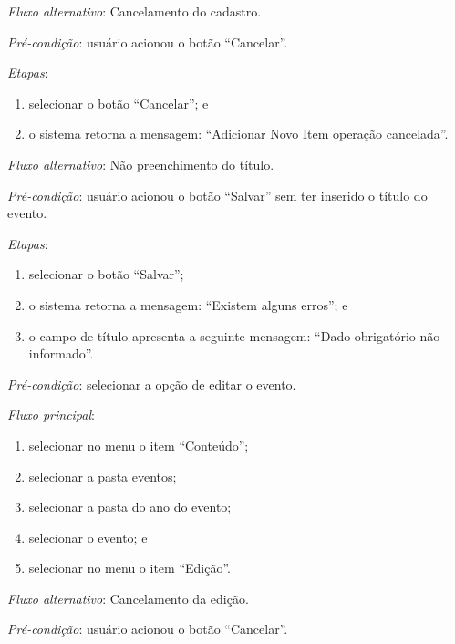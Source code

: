 \documentclass[a4paper,12pt]{article}
\begin{document}
\noindent \textit{Fluxo alternativo}: Cancelamento do cadastro.

\noindent \textit{Pré-condição}:  usuário acionou o botão ``Cancelar''.

\noindent \textit{Etapas}:

\begin{enumerate}
    \item selecionar o botão ``Cancelar''; e
    \item o sistema retorna a mensagem: ``Adicionar Novo Item operação cancelada''.
\end{enumerate}

\noindent \textit{Fluxo alternativo}: Não preenchimento do título.

\noindent \textit{Pré-condição}: usuário acionou o botão ``Salvar'' sem ter inserido o título do evento.

\noindent \textit{Etapas}:

\begin{enumerate}
    \item selecionar o botão ``Salvar'';
    \item o sistema retorna a mensagem: ``Existem alguns erros''; e
    \item o campo de título apresenta a seguinte mensagem: ``Dado obrigatório não informado''.
\end{enumerate}



\vspace{0.7cm}

\noindent \textit{Pré-condição}: selecionar a opção de editar o evento.

\noindent \textit{Fluxo principal}:

\begin{enumerate}
    \item selecionar no menu o item ``Conteúdo'';
    \item selecionar a pasta eventos;
    \item selecionar a pasta do ano do evento;
    \item selecionar o evento; e
    \item selecionar no menu o item ``Edição''.
\end{enumerate}

\noindent \textit{Fluxo alternativo}: Cancelamento da edição.

\noindent \textit{Pré-condição}: usuário acionou o botão ``Cancelar''.
\end{document}
